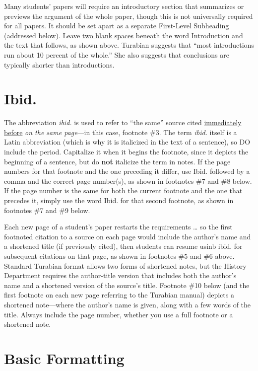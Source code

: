 \documentclass[raggedright]{turabian-researchpaper}
\begin{document}
Many students' papers will require an introductory section that summarizes or
previews the argument of the whole paper, though this is not universally
required for all papers.\autocite[390]{Turabian} It should be set apart as a
separate First-Level Subheading (addressed below). Leave \ul{two blank spaces}
beneath the word Introduction and the text that follows, as shown
above.\autocite[390]{Turabian} Turabian suggests that ``most introductions run
about 10 percent of the whole.''\autocite[104]{Turabian} She also suggests that
conclusions are typically shorter than introductions.

\section{Ibid.}

The abbreviation \textit{ibid.} is used to refer to ``the same'' source cited
\ul{immediately before} \emph{on the same page}\autocite[161]{Turabian}---in
this case, footnote \#3. The term \textit{ibid.} itself is a Latin abbreviation
(which is why it is italicized in the text of a sentence), so DO include the
period. Capitalize it when it begins the footnote, since it depicts the
beginning of a sentence, but do \textbf{not} italicize the term in
notes.\autocite[161]{Turabian} If the page numbers for that footnote and the one
preceding it differ, use Ibid. followed by a comma and the correct page
number(s), as shown in footnotes \#7 and \#8 below. If the page number is the
same for both the current footnote and the one that precedes it, simply use the
word Ibid. for that second footnote, as shown in footnotes \#7 and \#9 below.

Each new page of a student's paper restarts the requirements \dots{} so the
first footnoted citation to a source on each page would include the author's
name and a shortened title (if previously cited), then students can resume usinb
ibid. for subsequent citations on that page, as shown in footnotes \#5 and \#6
above. Standard Turabian format allows two forms of shortened
notes,\autocite[158-160]{Turabian} but the History Department requires the
author-title version that includes both the author's name and a shortened
version of the source's title. Footnote \#10 below (and the first footnote on
each new page referring to the Turabian manual) depicts a shortened note---where
the author's name is given, along with a few words of the title. Always include
the page number, whether you use a full footnote or a shortened note.

\section{Basic Formatting}
\end{document}
